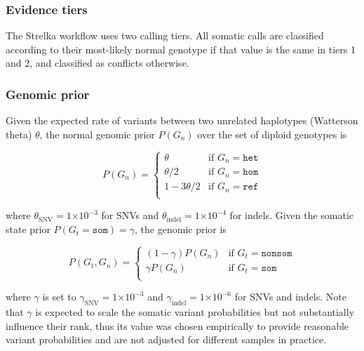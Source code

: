 \documentclass{article}
\newcommand{\e}[1]{\ensuremath{\times 10^{#1}}}
\begin{document}

\subsubsection{Evidence tiers}
\label{sec:SomaticEvidenceTiers}


The Strelka workflow uses two calling tiers. All somatic calls are classified according to their most-likely normal genotype if that value is the same in tiers 1 and 2, and classified as conflicts otherwise.

\subsubsection{Genomic prior}
Given the expected rate of variants between two unrelated haplotypes (Watterson theta) $\theta$, the normal genomic prior $P(G_n)$ over the set of diploid genotypes is

\begin{equation*}
P(G_n)=
\begin{cases}
	\theta & \text{if } G_n = \texttt{het} \\
	\theta/2 & \text{if } G_n = \texttt{hom} \\
	1 - 3\theta/2 & \text{if } G_n = \texttt{ref} \\
\end{cases}
\end{equation*}

\noindent where $\theta_{\text{SNV}}=1\e{-3}$ for SNVs and $\theta_{\text{indel}}=1\e{-4}$ for indels. Given the somatic state prior $P(G_t=\texttt{som}) = \gamma$, the genomic prior is

\begin{equation*}
P(G_t, G_n)=
\begin{cases}
	(1 - \gamma) P(G_n) & \text{if } G_t = \texttt{nonsom} \\
	\gamma P(G_n) & \text{if } G_t = \texttt{som} \\
\end{cases}
\end{equation*}

\noindent where $\gamma$ is set to $\gamma_{\text{SNV}} = 1\e{-3}$ and $\gamma_{\text{indel}} = 1\e{-6}$ for SNVs and indels. Note that $\gamma$ is expected to scale the somatic variant probabilities but not substantially influence their rank, thus its value was chosen empirically to provide reasonable variant probabilities and are not adjusted for different samples in practice.
\end{document}
